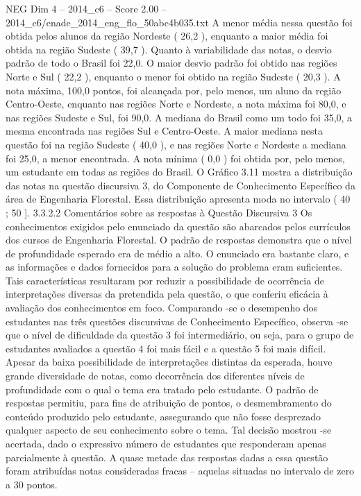 \begin{textsample}{NEG Dim 4 – 2014\_c6 – Score 2.00 – 2014\_c6/enade\_2014\_eng\_flo\_50abc4b035.txt}
A menor média nessa questão foi obtida pelos alunos da região Nordeste ( 26,2 ), enquanto a maior média foi obtida na região Sudeste ( 39,7 ).
Quanto à variabilidade das notas, o desvio padrão de todo o Brasil foi 22,0.
O maior desvio padrão foi obtido nas regiões Norte e Sul ( 22,2 ), enquanto o menor foi obtido na região Sudeste ( 20,3 ).
A nota máxima, 100,0 pontos, foi alcançada por, pelo menos, um aluno da região Centro-Oeste, enquanto nas regiões Norte e Nordeste, a nota máxima foi 80,0, e nas regiões Sudeste e Sul, foi 90,0.
A mediana do Brasil como um todo foi 35,0, a mesma encontrada nas regiões Sul e Centro-Oeste.
A maior mediana nesta questão foi na região Sudeste ( 40,0 ), e nas regiões Norte e Nordeste a mediana foi 25,0, a menor encontrada.
A nota mínima ( 0,0 ) foi obtida por, pelo menos, um estudante em todas as regiões do Brasil.
O Gráfico 3.11 mostra a distribuição das notas na questão discursiva 3, do Componente de Conhecimento Específico da área de Engenharia Florestal.
Essa distribuição apresenta moda no intervalo ( 40 ; 50 ]. 3.3.2.2 Comentários sobre as respostas à Questão Discursiva 3 Os conhecimentos exigidos pelo enunciado da questão são abarcados pelos currículos dos cursos de Engenharia Florestal.
O padrão de respostas demonstra que o nível de profundidade esperado era de médio a alto.
O enunciado era bastante claro, e as informações e dados fornecidos para a solução do problema eram suficientes.
Tais características resultaram por reduzir a possibilidade de ocorrência de interpretações diversas da pretendida pela questão, o que conferiu eficácia à avaliação dos conhecimentos em foco.
Comparando -se o desempenho dos estudantes nas três questões discursivas de Conhecimento Específico, observa -se que o nível de dificuldade da questão 3 foi intermediário, ou seja, para o grupo de estudantes avaliados a questão 4 foi mais fácil e a questão 5 foi mais difícil.
Apesar da baixa possibilidade de interpretações distintas da esperada, houve grande diversidade de notas, como decorrência dos diferentes níveis de profundidade com o qual o tema era tratado pelo estudante.
O padrão de respostas permitiu, para fins de atribuição de pontos, o desmembramento do conteúdo produzido pelo estudante, assegurando que não fosse desprezado qualquer aspecto de seu conhecimento sobre o tema.
Tal decisão mostrou -se acertada, dado o expressivo número de estudantes que responderam apenas parcialmente à questão.
A quase metade das respostas dadas a essa questão foram atribuídas notas consideradas fracas – aquelas situadas no intervalo de zero a 30 pontos.

\end{textsample}
